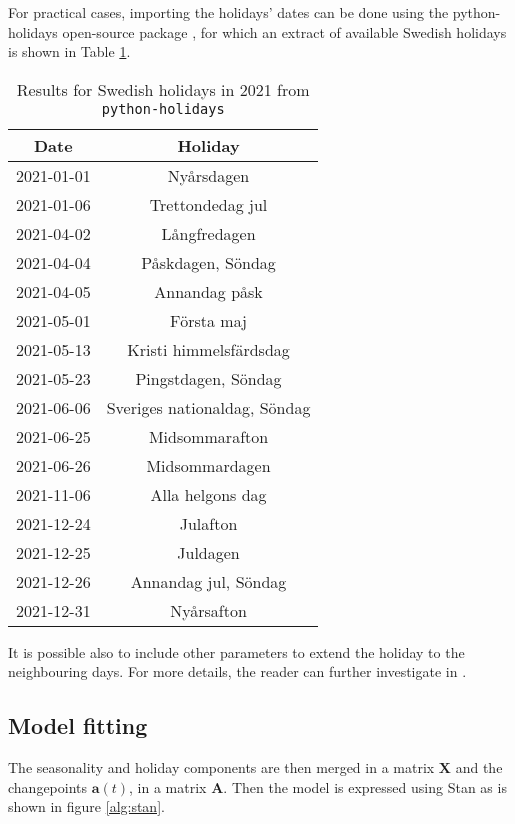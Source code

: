 For practical cases, importing the holidays' dates can be done using the python-holidays open-source package \cite{Holidays}, for which an extract of available Swedish holidays is shown in Table \ref{table:sv_holidays}.

\begin{table}[H]
	\centering
	\begin{tabular}{|c|c|}
		\hline
		\textbf{Date} & \textbf{Holiday} \\
		\hline
		2021-01-01 &Nyårsdagen \\
		2021-01-06 &Trettondedag jul \\
		2021-04-02 &Långfredagen \\
		2021-04-04 &Påskdagen, Söndag \\
		2021-04-05 &Annandag påsk \\
		2021-05-01 &Första maj \\
		2021-05-13 &Kristi himmelsfärdsdag \\
		2021-05-23 &Pingstdagen, Söndag \\
		2021-06-06 &Sveriges nationaldag, Söndag \\
		2021-06-25 &Midsommarafton \\
		2021-06-26 &Midsommardagen \\
		2021-11-06 &Alla helgons dag \\
		2021-12-24 &Julafton \\
		2021-12-25 &Juldagen \\
		2021-12-26 &Annandag jul, Söndag \\
		2021-12-31 &Nyårsafton \\
		\hline
	\end{tabular}
	\caption{Results for Swedish holidays in 2021 from \texttt{python-holidays}}
	\label{table:sv_holidays}
\end{table}

It is possible also to include other parameters to extend the holiday to the neighbouring days. For more details, the reader can further investigate in \cite{fb_prophet}.

\subsection{Model fitting}

The seasonality and holiday components are then merged in a matrix $\bm{X}$ and the changepoints $\bm{a}(t)$, in a matrix $\bm{A}$. Then the model is expressed using Stan\cite{carpenter2017stan} as is shown in figure \ref{alg:stan}.

